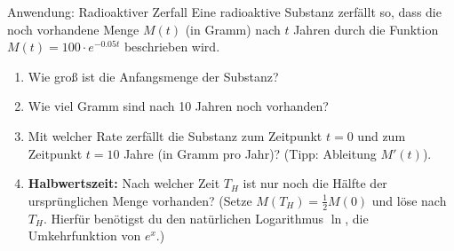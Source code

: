 \begin{aufgabenumgebung}{Anwendung: Radioaktiver Zerfall}
Eine radioaktive Substanz zerfällt so, dass die noch vorhandene Menge $M(t)$ (in Gramm) nach $t$ Jahren durch die Funktion $M(t) = 100 \cdot e^{-0.05t}$ beschrieben wird.
\begin{enumerate}
    \item Wie groß ist die Anfangsmenge der Substanz?
    \item Wie viel Gramm sind nach 10 Jahren noch vorhanden?
    \item Mit welcher Rate zerfällt die Substanz zum Zeitpunkt $t=0$ und zum Zeitpunkt $t=10$ Jahre (in Gramm pro Jahr)? (Tipp: Ableitung $M'(t)$).
    \item \textbf{Halbwertszeit:} Nach welcher Zeit $T_H$ ist nur noch die Hälfte der ursprünglichen Menge vorhanden? (Setze $M(T_H) = \frac{1}{2}M(0)$ und löse nach $T_H$. Hierfür benötigst du den natürlichen Logarithmus $\ln$, die Umkehrfunktion von $e^x$.)
\end{enumerate}
\end{aufgabenumgebung}

